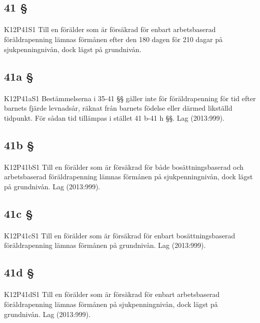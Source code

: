 \documentclass[a4paper,notitlepage,openany,10pt]{book}
\begin{document}
\subsection*{41 §}
\paragraph*{}
{\tiny K12P41S1}
Till en förälder som är försäkrad för enbart arbetsbaserad föräldrapenning lämnas förmånen efter den 180 dagen för 210 dagar på sjukpenningnivån, dock lägst på grundnivån.
\subsection*{41a §}
\paragraph*{}
{\tiny K12P41aS1}
Bestämmelserna i 35-41 §§ gäller inte för föräldrapenning för tid efter barnets fjärde levnadsår, räknat från barnets födelse eller därmed likställd tidpunkt.
För sådan tid tillämpas i stället 41 b-41 h §§.
Lag (2013:999).
\subsection*{41b §}
\paragraph*{}
{\tiny K12P41bS1}
Till en förälder som är försäkrad för både bosättningsbaserad och arbetsbaserad föräldrapenning lämnas förmånen på sjukpenningnivån, dock lägst på grundnivån.
Lag (2013:999).
\subsection*{41c §}
\paragraph*{}
{\tiny K12P41cS1}
Till en förälder som är försäkrad för enbart bosättningsbaserad föräldrapenning lämnas förmånen på grundnivån.
Lag (2013:999).
\subsection*{41d §}
\paragraph*{}
{\tiny K12P41dS1}
Till en förälder som är försäkrad för enbart arbetsbaserad föräldrapenning lämnas förmånen på sjukpenningnivån, dock lägst på grundnivån.
Lag (2013:999).
\end{document}
